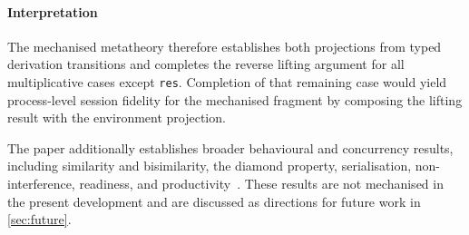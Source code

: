 \paragraph{Interpretation} The mechanised metatheory therefore establishes both projections from typed derivation transitions and completes the reverse lifting argument for all multiplicative cases except \texttt{res}. Completion of that remaining case would yield process-level session fidelity for the mechanised \pimll{} fragment by composing the lifting result with the environment projection.

The paper additionally establishes broader behavioural and concurrency results, including similarity and bisimilarity, the diamond property, serialisation, non-interference, readiness, and productivity~\citep{abs-2106-11818}. These results are not mechanised in the present development and are discussed as directions for future work in \cref{sec:future}.
